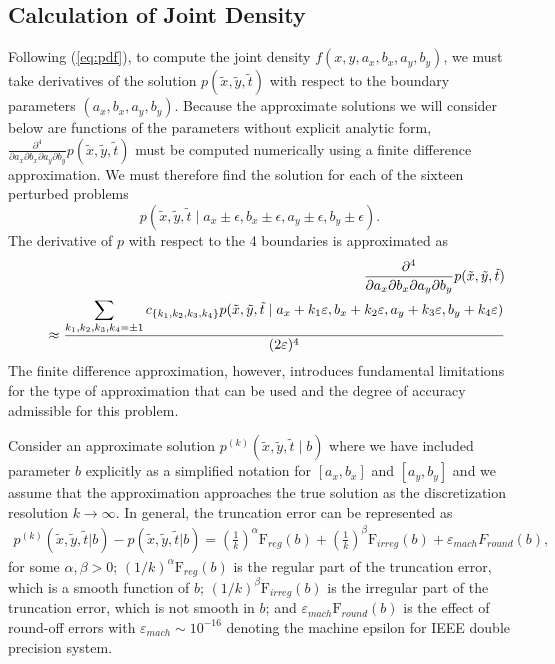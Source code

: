 \subsection{Calculation of Joint Density} \label{sec:likelihood-calc} Following
(\ref{eq:pdf}), to compute the joint density $f(x,y,a_x,b_x,a_y,b_y)$,
we must take derivatives of the solution
$p(\tilde{x},\tilde{y},\tilde{t})$ with respect to the boundary
parameters $(a_x, b_x, a_y, b_y)$. Because the approximate solutions
we will consider below are functions of the parameters without
explicit analytic form,
$\frac{\partial^4}{\partial a_x\partial b_x \partial a_y \partial
  b_y}p(\tilde{x},\tilde{y},\tilde{t})$ must be computed numerically
using a finite difference approximation. We must therefore find the
solution for each of the sixteen perturbed problems
\[
  p(\tilde{x},\tilde{y},\tilde{t} \mid a_x \pm \epsilon, b_x \pm \epsilon, a_y \pm \epsilon, b_y
  \pm \epsilon).
\]
The derivative of $p$ with respect to the 4 boundaries is approximated
as
\begin{eqnarray*}
& & \frac{\partial^4}{\partial a_x \partial b_x \partial a_y \partial b_y} p(\tilde{x},\tilde{y},\tilde{t})
\nonumber \\
& & \hspace*{0.5cm} \approx \frac{\displaystyle \sum_{k_1, k_2, k_3, k_4 = \pm 1}
c_{\{ k_1, k_2, k_3, k_4 \} } p( \tilde{x},\tilde{y},\tilde{t} \mid a_x+k_1 \varepsilon, b_x+k_2 \varepsilon,
a_y+k_3 \varepsilon, b_y+k_4 \varepsilon) }{(2 \varepsilon )^4}
\nonumber
\end{eqnarray*}
The finite difference approximation, however, introduces fundamental
limitations for the type of approximation that can be used and the
degree of accuracy admissible for this problem.

Consider an approximate solution
$p^{(k)}( \tilde{x},\tilde{y},\tilde{t} \mid b)$ where we
have included parameter $b $ explicitly as a simplified notation for
$[a_x, b_x]$ and $[a_y, b_y]$ and we assume that the approximation
approaches the true solution as the discretization resolution
$k \to \infty$. In general, the truncation error can be represented as
\begin{align}
  p^{(k)}(\tilde{x},\tilde{y},\tilde{t} | b) - p(\tilde{x},\tilde{y},\tilde{t} | b) = \left( \frac{1}{k}
  \right)^{\alpha} \mbox{F}_{reg}(b) + \left( \frac{1}{k}
  \right)^{\beta}\mbox{F}_{irreg}(b) + \varepsilon_{mach}F_{round}(b), \label{eq:trunc-error}
\end{align}
for some $\alpha, \beta > 0$; $(1/k)^{\alpha} \mbox{F}_{reg}(b) $ is
the regular part of the truncation error, which is a smooth function of $b$;
$(1/k)^{\beta} \mbox{F}_{irreg}(b) $ is the irregular part of the
truncation error, which is not smooth in $b$; and $\varepsilon_{mach} \mbox{F}_{round}(b) $ is the
effect of round-off errors with $\varepsilon_{mach} \sim 10^{-16}$
denoting the machine epsilon for IEEE double precision system.

